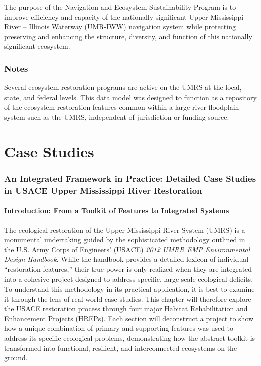 \documentclass[
  letterpaper,
  DIV=11,
  numbers=noendperiod]{scrreprt}
\begin{document}
The purpose of the Navigation and Ecosystem Sustainability Program is to
improve efficiency and capacity of the nationally significant Upper
Mississippi River -- Illinois Waterway (UMR-IWW) navigation system while
protecting preserving and enhancing the structure, diversity, and
function of this nationally significant ecosystem.

\subsection{Notes}\label{notes}

Several ecosystem restoration programs are active on the UMRS at the
local, state, and federal levels. This data model was designed to
function as a repository of the ecosystem restoration features common
within a large river floodplain system such as the UMRS, independent of
jurisdiction or funding source.


\chapter{Case Studies}\label{case-studies}

\subsection{\texorpdfstring{\textbf{An Integrated Framework in Practice:
Detailed Case Studies in USACE Upper Mississippi River
Restoration}}{An Integrated Framework in Practice: Detailed Case Studies in USACE Upper Mississippi River Restoration}}\label{an-integrated-framework-in-practice-detailed-case-studies-in-usace-upper-mississippi-river-restoration}

\subsubsection{\texorpdfstring{\textbf{Introduction: From a Toolkit of
Features to Integrated
Systems}}{Introduction: From a Toolkit of Features to Integrated Systems}}\label{introduction-from-a-toolkit-of-features-to-integrated-systems}

The ecological restoration of the Upper Mississippi River System (UMRS)
is a monumental undertaking guided by the sophisticated methodology
outlined in the U.S. Army Corps of Engineers' (USACE) \emph{2012 UMRR
EMP Environmental Design Handbook}. While the handbook provides a
detailed lexicon of individual ``restoration features,'' their true
power is only realized when they are integrated into a cohesive project
designed to address specific, large-scale ecological deficits. To
understand this methodology in its practical application, it is best to
examine it through the lens of real-world case studies. This chapter
will therefore explore the USACE restoration process through four major
Habitat Rehabilitation and Enhancement Projects (HREPs). Each section
will deconstruct a project to show how a unique combination of primary
and supporting features was used to address its specific ecological
problems, demonstrating how the abstract toolkit is transformed into
functional, resilient, and interconnected ecosystems on the ground.
\end{document}
